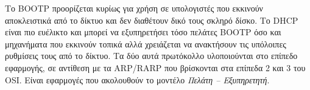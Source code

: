 Το BOOTP προορίζεται κυρίως για χρήση σε υπολογιστές που εκκινούν αποκλειστικά από το δίκτυο και δεν διαθέτουν δικό τους σκληρό δίσκο. Το DHCP είναι πιο ευέλικτο και μπορεί να εξυπηρετήσει τόσο πελάτες BOOTP όσο και μηχανήματα που εκκινούν τοπικά αλλά χρειάζεται να ανακτήσουν τις υπόλοιπες ρυθμίσεις τους από το δίκτυο. Τα δύο αυτά πρωτόκολλο υλοποιούνται στο επίπεδο εφαρμογής, σε αντίθεση με τα ARP/RARP που βρίσκονται στα επίπεδα 2 και 3 του OSI. Είναι εφαρμογές που ακολουθούν το μοντέλο \emph{Πελάτη -- Εξυπηρετητή}.
